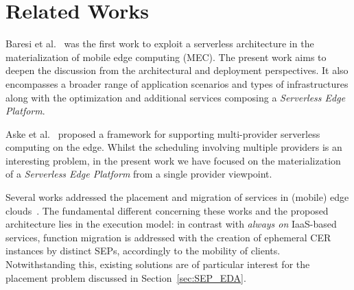 \section{Related Works}\label{sec:related_works}



Baresi et al.~\cite{GarrigaMendonca2017} was the first work to exploit a serverless architecture in the materialization of mobile edge computing (MEC). The present work aims to  deepen the discussion from the architectural and deployment perspectives. It also encompasses a broader range of application scenarios and types of infrastructures along with the optimization and additional services composing a \textit{Serverless Edge Platform}.

Aske et al.~\cite{Aske:2018} proposed a framework for supporting multi-provider serverless computing on the edge. Whilst the scheduling involving multiple 
providers is an interesting problem, in the present work we have focused on the materialization of a \textit{Serverless Edge Platform} from a single provider viewpoint. %

Several works addressed the placement and migration of services in (mobile) edge clouds~\cite{Wang:2015a,Plachy:2016,Machen:2018}. The fundamental different concerning these works and the proposed architecture lies in the execution model: in contrast with \textit{always on} IaaS-based services, %
function migration is addressed with the creation of ephemeral CER instances by distinct SEPs, accordingly to the mobility of clients. Notwithstanding this, existing solutions are of particular interest for the  
placement problem discussed in Section~\ref{sec:SEP_EDA}.





